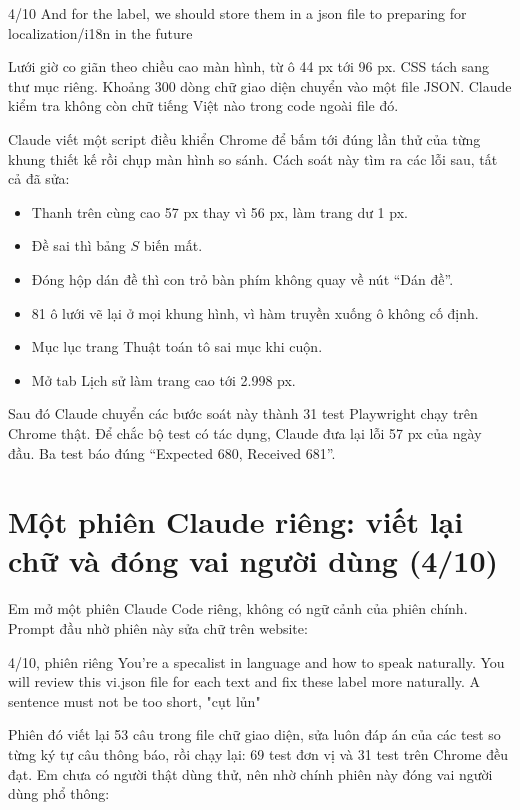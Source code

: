 \begin{promptbox}{4/10}
And for the label, we should store them in a json file to preparing for localization/i18n in the future
\end{promptbox}

Lưới giờ co giãn theo chiều cao màn hình, từ ô 44 px tới 96 px. CSS tách sang thư mục riêng. Khoảng 300 dòng chữ giao diện chuyển vào một file JSON. Claude kiểm tra không còn chữ tiếng Việt nào trong code ngoài file đó.

Claude viết một script điều khiển Chrome để bấm tới đúng lần thử của từng khung thiết kế rồi chụp màn hình so sánh. Cách soát này tìm ra các lỗi sau, tất cả đã sửa:

\begin{itemize}
  \item Thanh trên cùng cao 57 px thay vì 56 px, làm trang dư 1 px.
  \item Đề sai thì bảng $S$ biến mất.
  \item Đóng hộp dán đề thì con trỏ bàn phím không quay về nút ``Dán đề''.
  \item 81 ô lưới vẽ lại ở mọi khung hình, vì hàm truyền xuống ô không cố định.
  \item Mục lục trang Thuật toán tô sai mục khi cuộn.
  \item Mở tab Lịch sử làm trang cao tới 2.998 px.
\end{itemize}

Sau đó Claude chuyển các bước soát này thành 31 test Playwright chạy trên Chrome thật. Để chắc bộ test có tác dụng, Claude đưa lại lỗi 57 px của ngày đầu. Ba test báo đúng ``Expected 680, Received 681''.

\section{Một phiên Claude riêng: viết lại chữ và đóng vai người dùng (4/10)}

Em mở một phiên Claude Code riêng, không có ngữ cảnh của phiên chính. Prompt đầu nhờ phiên này sửa chữ trên website:

\begin{promptbox}{4/10, phiên riêng}
You're a specalist in language and how to speak naturally. You will review this vi.json file for each text and fix these label more naturally. A sentence must not be too short, "cụt lủn"
\end{promptbox}

Phiên đó viết lại 53 câu trong file chữ giao diện, sửa luôn đáp án của các test so từng ký tự câu thông báo, rồi chạy lại: 69 test đơn vị và 31 test trên Chrome đều đạt. Em chưa có người thật dùng thử, nên nhờ chính phiên này đóng vai người dùng phổ thông:


